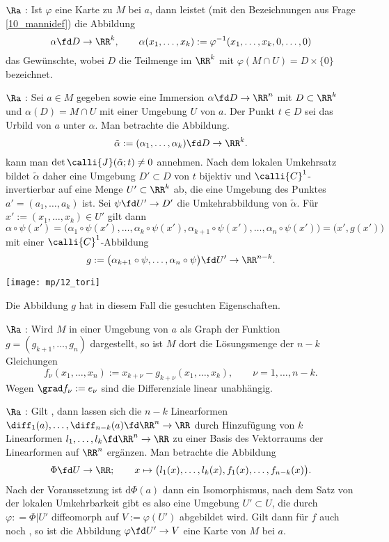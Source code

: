 \begin{antwort}
  \medskip\noindent
   $\Ra$ : Ist $\varphi$ 
  eine Karte zu $M$ bei $a$, dann leistet (mit den 
  Bezeichnungen aus Frage \ref{10_mannidef}) die Abbildung 
  \[
  \alpha\fd D \to \RR^k, \qquad
  \alpha( x_1, \ldots, x_k ) := \varphi^{-1} ( x_1, \ldots, x_k, 0,\ldots,0) 
  \]
  das Gewünschte, wobei $D$  die Teilmenge im $\RR^k$ mit 
  $\varphi( M\cap U ) = D \times \{ 0 \}$ bezeichnet. 

  \medskip\noindent
   $\Ra$ : 
  Sei $a\in M$ gegeben sowie eine Immersion $\alpha \fd D \to \RR^n$ 
  mit $D\subset \RR^k$ und $\alpha(D)= M\cap U$ mit einer Umgebung 
  $U$ von $a$. Der Punkt $t\in D$ sei das Urbild von $a$ unter $\alpha$. 
  Man betrachte die Abbildung.  
  \[
  \tilde{\alpha} := (\alpha_1, \ldots , \alpha_k ) \fd D \to \RR^k. 
  \]
  {\OBdA} kann man $\det \calli{J}( \tilde{\alpha}; t)\not=0$ 
  annehmen. Nach dem lokalen Umkehrsatz bildet $\tilde{\alpha}$ 
  daher eine Umgebung $D' \subset D$ von $t$ bijektiv und 
  $\calli{C}^1$-invertierbar auf eine Menge 
  $U' \subset\RR^k$ ab, die eine Umgebung des Punktes 
  $a'=(a_1,\ldots,a_k)$ ist. Sei $\psi \fd U' \to D'$ 
  die Umkehrabbildung von $\tilde{\alpha}$.  
  Für $x':=(x_1,\ldots,x_k) \in U'$ gilt dann 
  \[
  \alpha \circ \psi (x') =  
  \big( \alpha_1 \circ \psi(x'), \ldots, \alpha_k \circ \psi(x'), 
  \alpha_{k+1} \circ \psi(x'), \ldots, 
  \alpha_n \circ \psi(x') \big) = 
  \big( x', g(x') \big) 
  \]
  mit einer $\calli{C}^1$-Abbildung 
  \[
  g := \big( \alpha_{k+1} \circ \psi, 
  \ldots,  
  \alpha_{n} \circ \psi \big) 
  \fd U' \to \RR^{n-k}.
  \]

  \begin{center}
    \texttt{[image: mp/12\_tori]}
  \end{center}

  Die Abbildung $g$ hat in diesem Fall die gesuchten Eigenschaften. 

  \medskip\noindent
   $\Ra$ : Wird $M$ in einer Umgebung von $a$ als Graph der 
  Funktion $g=(g_{k+1},\ldots, g_n)$ dargestellt, so ist $M$ dort die 
  Lösungsmenge der $n-k$ Gleichungen 
  \[
  f_\nu (x_1,\ldots, x_n) := x_{k+\nu} - g_{k+\nu} ( x_1,\ldots, x_k ), 
  \qquad \nu = 1,\ldots,n-k.
  \]
  Wegen $\grad f_\nu := e_\nu$ sind die Differenziale linear unabhängig. 

  \medskip\noindent
   $\Ra$ : 
  Gilt , dann lassen sich die 
  $n-k$ Linearformen 
  $\diff _1(a),\ldots, \diff _{n-k}(a) \fd \RR^n \to \RR$ 
  durch Hinzufügung von $k$ Linearformen $l_1,\ldots,l_k \fd \RR^n\to \RR$ zu 
  einer Basis des Vektorraums der Linearformen auf $\RR^n$ ergänzen. 
  Man betrachte die Abbildung 
  \[
  \Phi \fd U \to \RR; \qquad x \mapsto \big( l_1(x),\ldots, l_k(x), f_1(x), 
  \ldots, f_{n-k} (x) \big).
  \]
  Nach der Voraussetzung ist $\mathrm{d}\Phi(a)$ dann ein Isomorphismus, nach 
  dem Satz von der lokalen Umkehrbarkeit gibt es also eine Umgebung 
  $U'\subset U$, die durch $\varphi: = \Phi|U'$ diffeomorph auf 
  $V:=\varphi(U')$ abgebildet wird. 
  Gilt dann für $f$ auch noch , 
  so ist die Abbildung $\varphi \fd U'\to V$ 
  eine Karte von $M$ bei $a$. \AntEnd 
\end{antwort} 


